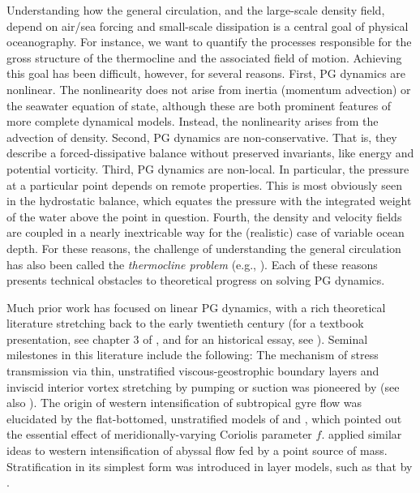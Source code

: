 \documentclass{ametsocV6.2}
\begin{document}
Understanding how the general circulation, and the large-scale density field, depend on air/sea forcing and small-scale dissipation is a central goal of physical oceanography.
For instance, we want to quantify the processes responsible for the gross structure of the thermocline and the associated field of motion.
Achieving this goal has been difficult, however, for several reasons.
First, PG dynamics are nonlinear. 
The nonlinearity does not arise from inertia (momentum advection) or the seawater equation of state, although these are both prominent features of more complete dynamical models.
Instead, the nonlinearity arises from the advection of density.
Second, PG dynamics are non-conservative. 
That is, they describe a forced-dissipative balance without preserved invariants, like energy and potential vorticity.
Third, PG dynamics are non-local.
In particular, the pressure at a particular point depends on remote properties.
This is most obviously seen in the hydrostatic balance, which equates the pressure with the integrated weight of the water above the point in question.
Fourth, the density and velocity fields are coupled in a nearly inextricable way for the (realistic) case of variable ocean depth.
For these reasons, the challenge of understanding the general circulation has also been called the \emph{thermocline problem} (e.g., \citealt{veronis69,welander71b}).
Each of these reasons presents technical obstacles to theoretical progress on solving PG dynamics.

Much prior work has focused on linear PG dynamics, with a rich theoretical literature stretching back to the early twentieth century (for a textbook presentation, see chapter 3 of \citealt{salmon98}, and for an historical essay, see \citealt{pedlosky06}).
Seminal milestones in this literature include the following:
The mechanism of stress transmission via thin, unstratified viscous-geostrophic boundary layers and inviscid interior vortex stretching by pumping or suction was pioneered by \citet{ekman05} (see also \citealt{greenspan90}).
The origin of western intensification of subtropical gyre flow was elucidated by the flat-bottomed, unstratified models of \citet{stommel48} and \citet{munk50}, which pointed out the essential effect of meridionally-varying Coriolis parameter $f$.
\citet{stommel&arons59} applied similar ideas to western intensification of abyssal flow fed by a point source of mass.
Stratification in its simplest form was introduced in layer models, such as that by \citet{welander68}.
\end{document}
